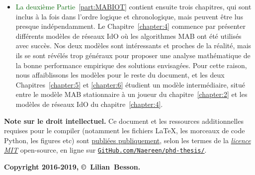 \begin{resume_fr}
\begin{itemize}
    \item
\textcolor{darkgreen}{La deuxième Partie~\ref{part:MABIOT}} contient ensuite trois chapitres, qui sont inclus à la fois dans l'ordre logique et chronologique, mais peuvent être lus presque indépendamment.
Le Chapitre~\ref{chapter:4} commence par présenter différents modèles de réseaux IdO où les algorithmes MAB ont été utilisés avec succès. Nos deux modèles sont intéressants et proches de la réalité, mais ils se sont révélés trop généraux pour proposer une analyse mathématique de la bonne performance empirique des solutions envisagées.
Pour cette raison, nous affaiblissons les modèles pour le reste du document,
et les deux Chapitres~\ref{chapter:5} et \ref{chapter:6} étudient un modèle intermédiaire, situé entre le modèle MAB stationnaire à un joueur du chapitre~\ref{chapter:2} et les modèles de réseaux IdO du chapitre~\ref{chapter:4}.
\end{itemize}


\vfill{}

\textbf{Note sur le droit intellectuel.}
%
Ce document et les ressources additionnelles requises pour le compiler (notamment les fichiers \LaTeX, les morceaux de code Python, les figures etc)
sont \href{https://github.com/Naereen/phd-thesis/}{publiées publiquement},
selon les termes de la \href{https://lbesson.mit-license.org/}{\emph{licence MIT}} open-source,
en ligne sur \href{https://github.com/Naereen/phd-thesis/}{\texttt{GitHub.com/Naereen/phd-thesis/}}.


\begin{center}
    \textbf{Copyright 2016-2019, \copyright ~Lilian~Besson.}
\end{center}


\end{resume_fr}
